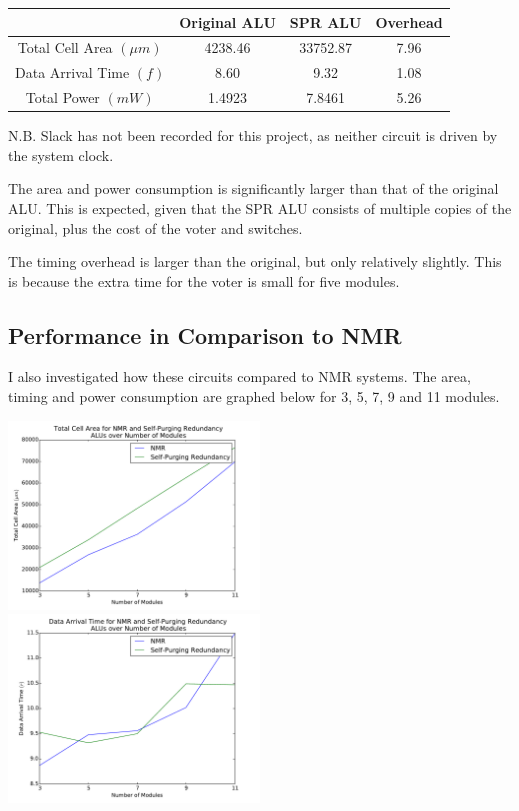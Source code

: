 \documentclass[a4paper,12pt]{article}
\begin{document}
    \begin{tabular}{|c|c|c|c|}
        \hline
        & Original ALU & SPR ALU & Overhead \\ \hline
        Total Cell Area $(\mu m)$ & 4238.46 & 33752.87 & 7.96 \\ \hline
        Data Arrival Time $(f)$ & 8.60 & 9.32 & 1.08 \\ \hline
        Total Power $(mW)$ & 1.4923 & 7.8461 & 5.26 \\ \hline
    \end{tabular}

    N.B. Slack has not been recorded for this project, as neither circuit is driven by the system clock.

    The area and power consumption is significantly larger than that of the original ALU. This is expected, given that the SPR ALU consists of multiple copies of the original, plus the cost of the voter and switches.

    The timing overhead is larger than the original, but only relatively slightly. This is because the extra time for the voter is small for five modules.

    \subsection{Performance in Comparison to NMR}
    I also investigated how these circuits compared to NMR systems. The area, timing and power consumption are graphed below for 3, 5, 7, 9 and 11 modules.

    \includegraphics[width=0.5\textwidth]{area_nmr}
    \includegraphics[width=0.5\textwidth]{time_nmr}
\end{document}
